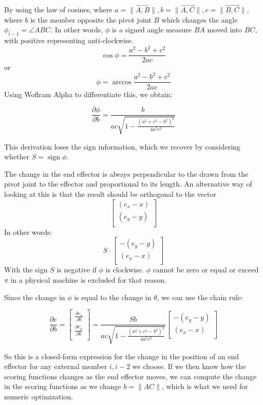 \documentclass[11pt]{article}
\DeclareMathOperator{\sign}{sign}
\begin{document}
By using the law of cosines, where $a = \|\overrightarrow{A,B}\|, b = \|\overrightarrow{A,C}\|, c = \|\overrightarrow{B,C}\| $,
where $b$ is the member opposite the pivot joint $B$ which changes the angle $ \phi_{i-1} = \angle ABC $. In other words, $\phi$ is a signed angle measure
$BA$ moved into $BC$, with positive representing anti-clockwise.
\[
\cos{\phi} = \frac{a^2 - b^2 + c^2}{2 a c}
\]
or
\[
\phi = \arccos{\frac{a^2 - b^2 + c^2}{2 a c}}
\]
Using Woflram Alpha to differentiate this, we obtain:

\[
\frac{\partial \phi}{\partial b} = \frac{b}{ac\sqrt{1 - \frac{(a^2 + c^2 - b^2)^2}{4a^2c^2}}}
\]

This derivation loses the sign information, which we recover by considering whether $S = \sign{\phi}$.

The change in the end effector is always perpendicular to the drawn from the pivot joint to the effector and proportional to its length.
An alternative way of looking at this is that the result should be orthogonal to the vector
\[
\begin{bmatrix}
           (e_x  - x) \\
           (e_y - y)  \\
\end{bmatrix}
\]
In other words:
\[
S \cdot
\begin{bmatrix}
           - (e_y  - y) \\
           (e_x - x)  \\
\end{bmatrix}
\]
With the sign $S$ is negative if $\phi$ is clockwise. $\phi$ cannot be zero or equal or exceed $\pi$ in a physical machine is excluded for that reason.

Since the change in $\phi$ is equal to the change in $\theta$, we can use the chain rule:

\[
\frac{\partial e}{\partial  b} = \begin{bmatrix}
           \frac{\partial e_x}{\partial b} \\
           \frac{\partial e_y}{\partial b} \\
         \end{bmatrix} = \frac{Sb}{ac\sqrt{1 - \frac{(a^2 + c^2 - b^2)^2}{4a^2c^2}}} \begin{bmatrix}
           -(e_y -y)  \\
           (e_x - x )  \\
         \end{bmatrix}
\]

So this is a closed-form expression for the change in the position of an end effector for any external member $i,i-2$ we choose. If we then know how the
scoring functions changes as the end effector moves, we can compute the change in the scoring functions as we change $b = \| AC \|$, which is what
we need for numeric optimization.
\end{document}
